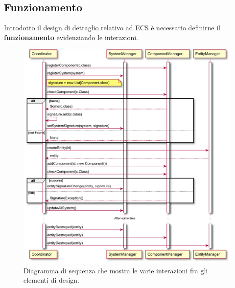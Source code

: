 \subsection{Funzionamento}
Introdotto il design di dettaglio relativo ad ECS è necessario definirne il \textbf{funzionamento} evidenziando le interazioni.
\begin{figure}[H]
	\centering
	\includegraphics[width=0.99\columnwidth]{plantuml/rendered/sequenceDiagrams/sequenceECS.pdf}
	\caption{Diagramma di sequenza che mostra le varie interazioni fra gli elementi di design.}
	\label{fig:sequenceECS}
\end{figure}

